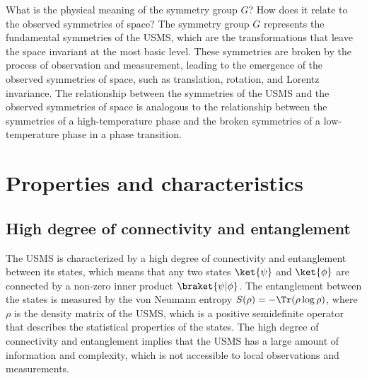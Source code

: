 \begin{tcolorbox}[colback=green!5!white,colframe=green!75!black,title=Question]
What is the physical meaning of the symmetry group $G$? How does it relate to the observed symmetries of space?
\tcblower
The symmetry group $G$ represents the fundamental symmetries of the USMS, which are the transformations that leave the space invariant at the most basic level. These symmetries are broken by the process of observation and measurement, leading to the emergence of the observed symmetries of space, such as translation, rotation, and Lorentz invariance. The relationship between the symmetries of the USMS and the observed symmetries of space is analogous to the relationship between the symmetries of a high-temperature phase and the broken symmetries of a low-temperature phase in a phase transition.
\end{tcolorbox}

\section{Properties and characteristics}
\subsection{High degree of connectivity and entanglement}
The USMS is characterized by a high degree of connectivity and entanglement between its states, which means that any two states $\ket{\psi}$ and $\ket{\phi}$ are connected by a non-zero inner product $\braket{\psi|\phi}$. The entanglement between the states is measured by the von Neumann entropy $S(\rho) = -\Tr(\rho \log \rho)$, where $\rho$ is the density matrix of the USMS, which is a positive semidefinite operator that describes the statistical properties of the states. The high degree of connectivity and entanglement implies that the USMS has a large amount of information and complexity, which is not accessible to local observations and measurements.

